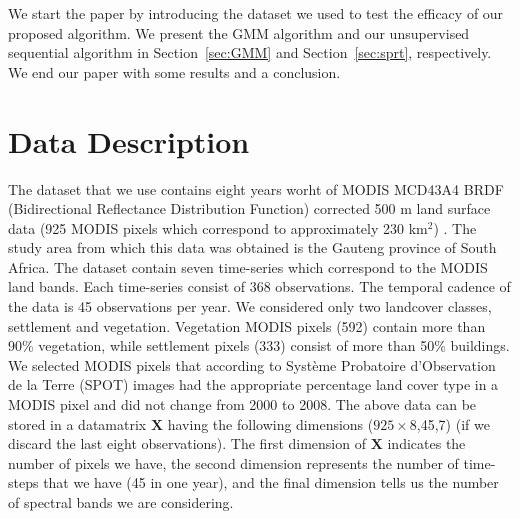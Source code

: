 \documentclass{article}
\begin{document}
We start the paper by introducing the dataset we used to test the efficacy of our proposed algorithm. We present the GMM algorithm and our unsupervised sequential algorithm in Section~\ref{sec:GMM} and 
Section~\ref{sec:sprt}, respectively. We end our paper with some results and a conclusion.
\section{Data Description}
\label{sec:data}
The dataset that we use contains eight years worht of MODIS MCD43A4 BRDF (Bidirectional Reflectance Distribution Function) corrected 500 m land surface
data (925 MODIS pixels which correspond to approximately 230 km$^2$) \cite{grobler2012t}. The study area from which this data was obtained is the Gauteng province of South Africa. The dataset contain seven time-series which correspond to the 
MODIS land bands. Each time-series consist of 368 observations. The temporal cadence of the data is 45 observations per year. We considered only two landcover classes, settlement and vegetation. 
Vegetation MODIS pixels (592) contain more than 90\% vegetation, while settlement pixels (333) consist of more than 50\% buildings. We selected MODIS pixels that according to Système Probatoire d’Observation de la Terre (SPOT) images had the appropriate percentage land cover type in a MODIS pixel and did not change from 2000 to 2008. The above data can be stored in a datamatrix $\mathbf{X}$ having the following dimensions ($925\times8$,45,7) (if we discard the last eight observations). The first dimension of $\mathbf{X}$ indicates the number of pixels we have, the second dimension represents the number of time-steps that we have (45 in one year), and the final dimension tells us the number of spectral bands we are considering.
\end{document}
